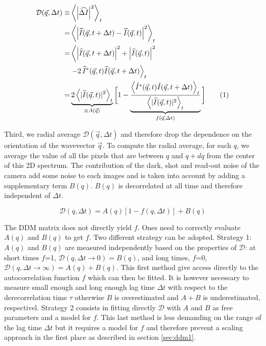 \documentclass[prb,twocolumn,amsmath,amssymb]{revtex4-1}
\newcommand{\tgn}[1]{{\color{blue}#1}} %
\begin{document}
{%
\begin{align*}
\mathcal{D}(\vec{q},\Delta t) \equiv& \left\langle \left|\widehat{\Delta I}\right|^2 \right\rangle_t\\
 =& \left\langle \left|\widehat{I}(\vec{q},t+\Delta t) - \widehat{I}(\vec{q},t)\right|^2 \right\rangle_t \\
=& \left\langle \left|\widehat{I}(\vec{q},t+ \Delta t)\right|^2 + \left|\widehat{I}(\vec{q},t)\right|^2\right. \\
&\left.- 2 \, \widehat{I}^*(\vec{q},t) \widehat{I}(\vec{q},t+\Delta t) \right\rangle_t\\
=& \underbrace{2\left\langle | \widehat{I}(\vec{q},t)|^2  \right\rangle_t}_{\equiv A(\vec{q})} \bigg[ 1-\underbrace{\frac{\left\langle \hat{I}^*(\vec{q}, t) \hat{I}(\vec{q}, t+\Delta t) \right\rangle_t}{\left\langle | \widehat{I}(\vec{q},t)|^2  \right\rangle_t }}_{f(\vec{q}, \Delta t)} \bigg]
\addtocounter{equation}{1}\tag{\theequation} \label{eq:DDM}
\end{align*}
}

\tgn{Third, we radial average $\mathcal{D}(\vec{q},\Delta t)$ and therefore drop the dependence on the orientation of the wavevector $\vec{q}$.  To compute the radial average, for each $q$, we average the value of all the pixels that are between $q$ and $q+dq$ from the center of this 2D spectrum}. The contribution of the dark, shot and read-out noise\cite{Mignard2015,Joubert2011} of the camera add some noise to each images and is taken into account by adding a supplementary term $B(q)$. $B(q)$ is decorrelated  at all time and therefore independent of $\Delta t$.

\begin{equation}
\mathcal{D}(q,\Delta t) = A(q)\left[1-f(q, \Delta t)\right] + B(q)
\label{eq:D2f}
\end{equation}

The DDM matrix does not directly yield $f$. Ones need to correctly evaluate $A(q)$ and $B(q)$ to get $f$. Two different strategy can be adopted. Strategy 1: $A(q)$ and $B(q)$ are measured independently based on the properties of $\mathcal{D}$: at short times $f$=1, $\mathcal{D}(q,\Delta t\rightarrow 0) = B(q)$, and long times, $f$=0, $\mathcal{D}(q,\Delta t\rightarrow \infty) = A(q)+B(q)$. This first method give access directly to the autocorrelation function $f$ which can then be fitted. It is however necessary to measure small enough and  long enough lag time $\Delta t$ with respect to the derecorrelation time $\tau$ otherwise $B$ is overestimated and $A+B$ is underestimated, respectivel. Strategy 2 consists in fitting directly $\mathcal{D}$ with $A$ and $B$ as free parameters and a model for $f$. This last method is less demanding on the range of the lag time $\Delta t$ but it requires a model for $f$ and therefore prevent a scaling approach in the first place as described in section \ref{sec:ddm1}.
\end{document}
